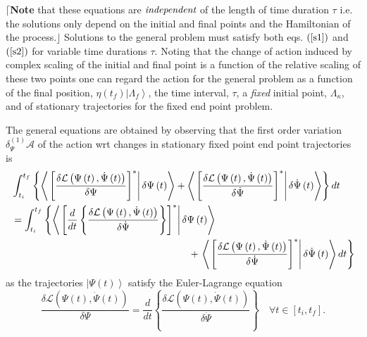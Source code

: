\documentclass[aps,preprint]{revtex4}
\begin{document}
$\lceil$\textbf{Note }that these equations are $\emph{independent}$ of the
length of time duration $\tau$ i.e. the solutions only depend on the initial
and final points and the Hamiltonian of the process.$\rfloor$ Solutions to
the general problem must satisfy both eqs. $\left( \ref{s1}\right) $ and $%
\left( \ref{s2}\right) $ for variable time durations $\tau$. Noting that the
change of action induced by complex scaling of the initial and final point
is a function of the relative scaling of these two points one can regard the
action for the general problem as a function of the final position, $%
\eta\left( t_{f}\right) \left| \Lambda_{f}\right\rangle $, the time
interval, $\tau$, a \emph{fixed} initial point, $\Lambda_{\kappa}$, and of
stationary trajectories for the fixed end point problem.

The general equations are obtained by observing that the first order
variation $\delta_{\Psi}^{\left( 1\right) }\mathcal{A}$ of the action wrt
changes in stationary fixed point end point trajectories is 
\begin{align}
& \int_{t_{i}}^{t_{f}}\left\{ \left\langle \left. \left[ \frac {\delta%
\mathcal{L}\left( \Psi\left( t\right) ,\dot{\Psi}\left( t\right) \right) }{%
\delta\Psi}\right] ^{\ast}\right\vert \delta\Psi\left( t\right)
\right\rangle +\left\langle \left. \left[ \frac{\delta\mathcal{L}\left(
\Psi\left( t\right) ,\dot{\Psi}\left( t\right) \right) }{\delta\dot{\Psi }}%
\right] ^{\ast}\right\vert \delta\dot{\Psi}\left( t\right) \right\rangle
\right\} dt  \notag \\
& \left. =\right. \int_{t_{i}}^{t_{f}}\left\{ \left\langle \left. \left[ 
\frac{d}{dt}\left\{ \frac{\delta\mathcal{L}\left( \Psi\left( t\right) ,\dot{%
\Psi}\left( t\right) \right) }{\delta\dot{\Psi}}\right\} \right]
^{\ast}\right\vert \delta\Psi\left( t\right) \right\rangle \right.  \notag \\
& \qquad\qquad\qquad\qquad\qquad\qquad\qquad\qquad\qquad+\left. \left\langle
\left. \left[ \frac{\delta\mathcal{L}\left( \Psi\left( t\right) ,\dot{\Psi}%
\left( t\right) \right) }{\delta\dot{\Psi}}\right] ^{\ast }\right\vert \delta%
\dot{\Psi}\left( t\right) \right\rangle dt\right\}  \label{HJ1}
\end{align}
as the trajectories $\left\vert \Psi\left( t\right) \right\rangle $ satisfy
the Euler-Lagrange equation 
\begin{equation}
\frac{\delta\mathcal{L}\left( \Psi\left( t\right) ,\dot{\Psi}\left( t\right)
\right) }{\delta\Psi}=\frac{d}{dt}\left\{ \frac{\delta \mathcal{L}\left(
\Psi\left( t\right) ,\dot{\Psi}\left( t\right) \right) }{\delta\dot{\Psi}}%
\right\} \quad\forall t\in\left[ t_{i},t_{f}\right] .
\end{equation}
\end{document}
